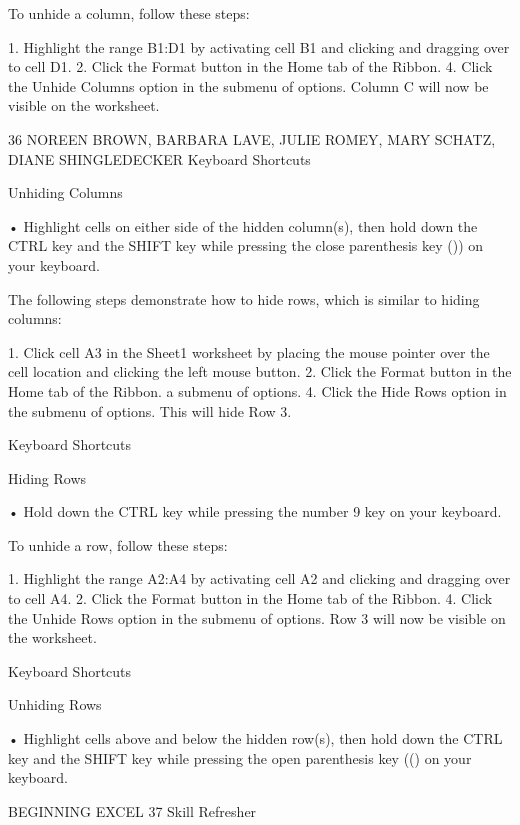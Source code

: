 To unhide a column, follow these steps:

1.    Highlight the range B1:D1 by activating cell B1 and clicking and dragging over to cell D1.
2.    Click the Format button in the Home tab of the Ribbon.
4.    Click the Unhide Columns option in the submenu of options. Column C will now be visible on
the worksheet.

36 NOREEN BROWN, BARBARA LAVE, JULIE ROMEY, MARY SCHATZ, DIANE SHINGLEDECKER
Keyboard Shortcuts


Unhiding Columns

• Highlight cells on either side of the hidden column(s), then hold down the CTRL key and the SHIFT key while
pressing the close parenthesis key ()) on your keyboard.



The following steps demonstrate how to hide rows, which is similar to hiding columns:

1. Click cell A3 in the Sheet1 worksheet by placing the mouse pointer over the cell location and
clicking the left mouse button.
2. Click the Format button in the Home tab of the Ribbon.
a submenu of options.
4. Click the Hide Rows option in the submenu of options. This will hide Row 3.


Keyboard Shortcuts


Hiding Rows

• Hold down the CTRL key while pressing the number 9 key on your keyboard.



To unhide a row, follow these steps:

1.    Highlight the range A2:A4 by activating cell A2 and clicking and dragging over to cell A4.
2.    Click the Format button in the Home tab of the Ribbon.
4.    Click the Unhide Rows option in the submenu of options. Row 3 will now be visible on the
worksheet.


Keyboard Shortcuts


Unhiding Rows

• Highlight cells above and below the hidden row(s), then hold down the CTRL key and the SHIFT key while
pressing the open parenthesis key (() on your keyboard.




BEGINNING EXCEL 37
Skill Refresher


